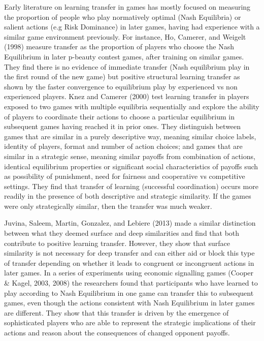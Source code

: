 \documentclass[man,floatsintext]{apa6}
\begin{document}
Early literature on learning transfer in games has mostly focused on measuring the proportion of people who play normatively optimal (Nash Equilibria) or salient actions (e.g Risk Dominance) in later games, having had experience with a similar game environment previously. For instance, Ho, Camerer, and Weigelt (1998) measure transfer as the proportion of players who choose the Nash Equilibrium in later p-beauty contest games, after training on similar games. They find there is no evidence of immediate transfer (Nash equilibrium play in the first round of the new game) but positive structural learning transfer as shown by the faster convergence to equilibrium play by experienced vs non experienced players. Knez and Camerer (2000) test learning transfer in players exposed to two games with multiple equilibria sequentially and explore the ability of players to coordinate their actions to choose a particular equilibrium in subsequent games having reached it in prior ones. They distinguish between games that are similar in a purely descriptive way, meaning similar choice labels, identity of players, format and number of action choices; and games that are similar in a strategic sense, meaning similar payoffs from combination of actions, identical equilibrium properties or significant social characteristics of payoffs such as possibility of punishment, need for fairness and cooperative vs competitive settings. They find that transfer of learning (successful coordination) occurs more readily in the presence of both descriptive and strategic similarity. If the games were only strategically similar, then the transfer was much weaker.

Juvina, Saleem, Martin, Gonzalez, and Lebiere (2013) made a similar distinction between what they deemed surface and deep similarities and find that both contribute to positive learning transfer. However, they show that surface similarity is not necessary for deep transfer and can either aid or block this type of transfer depending on whether it leads to congruent or incongruent actions in later games. In a series of experiments using economic signalling games (Cooper \& Kagel, 2003, 2008) the researchers found that participants who have learned to play according to Nash Equilibrium in one game can transfer this to subsequent games, even though the actions consistent with Nash Equilibrium in later games are different. They show that this transfer is driven by the emergence of sophisticated players who are able to represent the strategic implications of their actions and reason about the consequences of changed opponent payoffs.
\end{document}
